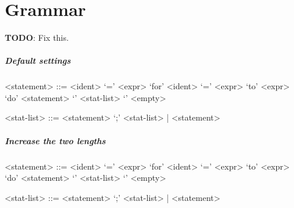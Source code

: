 \chapter{\uclid{} Grammar}

\textbf{TODO}: Fix this.

\paragraph{Default settings}
\begin{grammar}

<statement> ::= <ident> `=' <expr>
\alt `for' <ident> `=' <expr> `to' <expr> `do' <statement>
\alt `{' <stat-list> `}'
\alt <empty>

<stat-list> ::= <statement> `;' <stat-list> | <statement>

\end{grammar}
\paragraph{Increase the two lengths}
\setlength{\grammarparsep}{20pt plus 1pt minus 1pt} %
\setlength{\grammarindent}{12em} %

\begin{grammar}

<statement> ::= <ident> `=' <expr>
\alt `for' <ident> `=' <expr> `to' <expr> `do' <statement>
\alt `{' <stat-list> `}'
\alt <empty>

<stat-list> ::= <statement> `;' <stat-list> | <statement>

\end{grammar}
